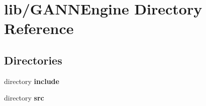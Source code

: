 \section{lib/\+G\+A\+N\+N\+Engine Directory Reference}
\label{dir_32ced1f582d1048e18f5e25ed5e27cb8}
\subsection*{Directories}
\begin{DoxyCompactItemize}
\item 
directory {\bf include}
\item 
directory {\bf src}
\end{DoxyCompactItemize}
